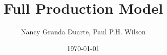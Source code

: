 \documentclass[12pt, letterpaper]{article}
\title{Full Production Model}
\author{Nancy Granda Duarte, Paul P.H. Wilson}
\date{\today}
\begin{document}
\maketitle






{}
\end{document}
